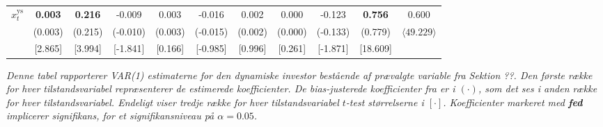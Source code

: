 \documentclass[
  a4paper,
  oneside]{memoir}
\begin{document}
\begin{table}[H]
{\begin{threeparttable}
\begin{tabular}[t]{ccccccccccc}
$x_t^{\text{ys}}$ & \textbf{ 0.003} & \textbf{ 0.216} & -0.009 & 0.003 & -0.016 & 0.002 & 0.000 & -0.123 & \textbf{ 0.756} & 0.600\\
 
\rowcolor{gray!6}   & (0.003) & (0.215) & (-0.010) & (0.003) & (-0.015) & (0.002) & (0.000) & (-0.133) & (0.779) & $\langle49.229\rangle$\\
 
 & [2.865] & [3.994] & [-1.841] & [0.166] & [-0.985] & [0.996] & [0.261] & [-1.871] & [18.609] & \\
\bottomrule
\end{tabular}
\begin{tablenotes}
\item \textit{Denne tabel rapporterer VAR(1) estimaterne for den dynamiske investor bestående af prævalgte variable fra Sektion ??. Den første række for hver tilstandsvariabel repræsenterer de estimerede koefficienter. De bias-justerede koefficienter fra \citep{Pope1990} er i $(\cdot)$, som det ses i anden række for hver tilstandsvariabel. Endeligt viser tredje række for hver tilstandsvariabel $t$-test størrelserne i $[\cdot]$. Koefficienter markeret med \textbf{fed} implicerer signifikans, for et signifikansniveau på $\alpha=0.05$.}
\end{tablenotes}
\end{threeparttable}}
\end{table}
\end{document}
